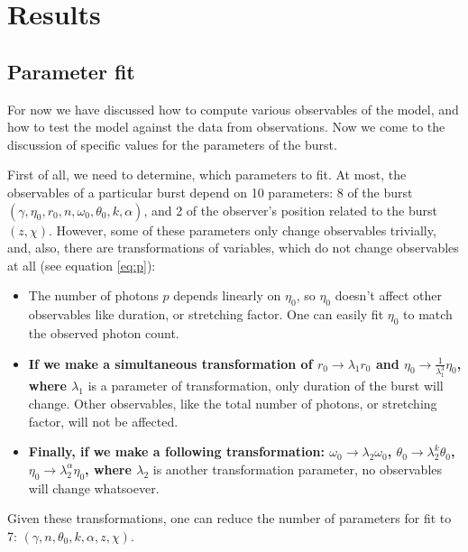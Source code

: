 \documentclass{article}
\begin{document}
\section{Results}
\label{sec:results}

\subsection{Parameter fit}
\label{sec:parameters}

For now we have discussed how to compute various observables of the model,
and how to test the model against the data from observations. Now we
come to the discussion of specific values for the parameters of the
burst.

First of all, we need to determine, which parameters to fit. At most,
the observables of a particular burst depend on 10 parameters: 8 of
the burst $\left(\gamma, \eta_0, r_0, n, \omega_0, \theta_0, k,
\alpha\right)$, and 2 of the observer's position related to the burst
$\left(z, \chi\right)$. However, some of these parameters only change
observables trivially, and, also, there are transformations of
variables, which do not change observables at all (see equation
\ref{eq:p}):
\begin{itemize}
	\item{The number of photons $p$ depends linearly on $\eta_0$,
          so $\eta_0$ doesn't affect other observables like duration,
          or stretching factor. One can easily fit $\eta_0$ to match
          the observed photon count.}
	\item{{\bf If we make a simultaneous transformation of $r_0
          \rightarrow \lambda_1 r_0$ and $\eta_0 \rightarrow
          \frac{1}{\lambda_1^3}\eta_0$, where $\lambda_1$} is a parameter
          of transformation, only duration of the burst will
          change. Other observables, like the total number of photons,
          or stretching factor, will not be affected.}
	\item{{\bf Finally, if we make a following transformation:
          $\omega_0 \rightarrow \lambda_2 \omega_0$, $\theta_0
          \rightarrow \lambda_2^k \theta_0$, $\eta_0 \rightarrow
          \lambda_2^\alpha \eta_0$, where $\lambda_2$ } is another
          transformation parameter, no observables will change
          whatsoever.}
\end{itemize}
Given these transformations, one can reduce the number of parameters
for fit to 7: $\left(\gamma, n, \theta_0, k, \alpha, z, \chi\right)$.
\end{document}
